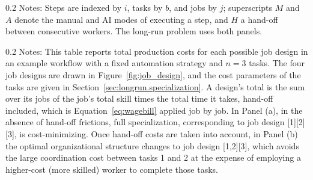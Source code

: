 \begin{minipage}{1\linewidth}
\begin{spacing}{0.2}
{\fontsize{9.5pt}{10pt}\selectfont Notes: Steps are indexed by $i$, tasks by $b$, and jobs by $j$; superscripts $M$ and $A$ denote the manual and AI modes of executing a step, and $H$ a hand-off between consecutive workers. The long-run problem uses both panels.}
\end{spacing}
\end{minipage}
\par\endgroup
\FloatBarrier


\begin{table}[p]
    \caption{Role of Hand-off Costs in Organizational Structure}
    \vspace{-0.3cm}
    \centering
    \label{tab:job_design}
    \footnotesize
    \begin{minipage}{1\linewidth}
\begin{spacing}{0.2}
{\fontsize{9.5pt}{10pt}\selectfont Notes: This table reports total production costs for each possible job design in an example workflow with a fixed automation strategy and $n = 3$ tasks.
The four job designs are drawn in Figure~\ref{fig:job_design}, and the cost parameters of the tasks are given in Section~\ref{sec:longrun.specialization}.
A design's total is the sum over its jobs of the job's total skill times the total time it takes, hand-off included, which is Equation~\eqref{eq:wagebill} applied job by job.
In Panel (a), in the absence of hand-off frictions, full specialization, corresponding to job design [1][2][3], is cost-minimizing.
Once hand-off costs are taken into account, in Panel (b) the optimal organizational structure changes to job design [1,2][3], which avoids the large coordination cost between tasks 1 and 2 at the expense of employing a higher-cost (more skilled) worker to complete those tasks.}
\end{spacing}
\end{minipage}


\end{table}
